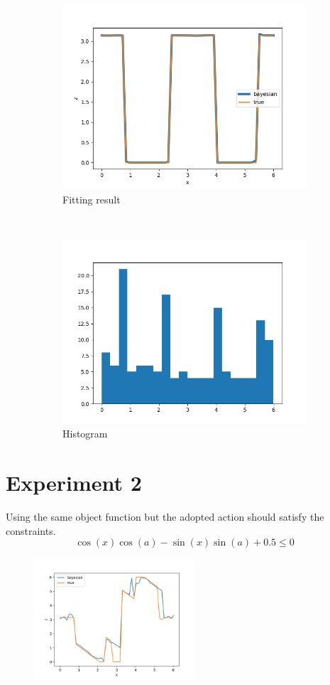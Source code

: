 \documentclass{article}
\begin{document}
\begin{figure}[!ht]
    \begin{subfigure}[b]{0.49\textwidth}
        \centering
        \includegraphics[width=\textwidth]{./cbo_1.png}
        \caption{Fitting result}
        \label{fig:rk_order_compare}
    \end{subfigure}~
    \begin{subfigure}[b]{0.49\textwidth}
      \centering
      \includegraphics[width=\textwidth]{./cbo_1_hist.png}
      \caption{Histogram}
      \label{fig:time_equal_verify}
    \end{subfigure}
    \caption{}
\end{figure}

\section{Experiment 2}
Using the same object function but the adopted action should
satisfy the constraints.
\begin{equation}
    \cos(x)  \cos(a) - \sin(x) \sin(a) + 0.5 \leq 0    
\end{equation}
\begin{figure}[!ht]
    \centering
    \includegraphics[width=6cm]{cbo_2.png}
\end{figure}
\end{document}
